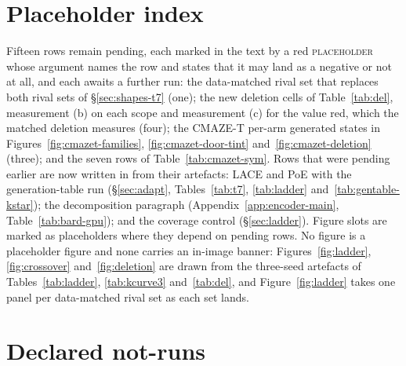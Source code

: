\documentclass{article} %
\begin{document}
\section{Placeholder index}
\label{app:placeholders}

Fifteen rows remain pending, each marked in the text by a red \textsc{placeholder} whose argument names
the row and states that it may land as a negative or not at all, and each awaits a further run: the
data-matched rival set that replaces both rival sets of \S\ref{sec:shapes-t7} (one); the new
deletion cells of Table~\ref{tab:del}, measurement (b) on each scope and measurement (c) for the
value red, which the matched deletion measures (four); the
CMAZE-T per-arm generated states in Figures~\ref{fig:cmazet-families}, \ref{fig:cmazet-door-tint}
and~\ref{fig:cmazet-deletion} (three); and the seven rows of Table~\ref{tab:cmazet-sym}. Rows
that were pending earlier are now written in from their artefacts: LACE and PoE with the generation-table run
(\S\ref{sec:adapt}, Tables~\ref{tab:t7}, \ref{tab:ladder} and~\ref{tab:gentable-kstar});
the decomposition paragraph (Appendix~\ref{app:encoder-main}, Table~\ref{tab:bard-gpu}); and the
coverage control
(\S\ref{sec:ladder}). Figure slots are marked as placeholders where they depend on pending rows.
No figure is a placeholder figure and none carries an in-image banner: Figures~\ref{fig:ladder},
\ref{fig:crossover} and~\ref{fig:deletion} are drawn from the three-seed artefacts of
Tables~\ref{tab:ladder}, \ref{tab:kcurve3} and~\ref{tab:del}, and Figure~\ref{fig:ladder} takes one
panel per data-matched rival set as each set lands.

\section{Declared not-runs}
\label{app:notrun}
\end{document}
